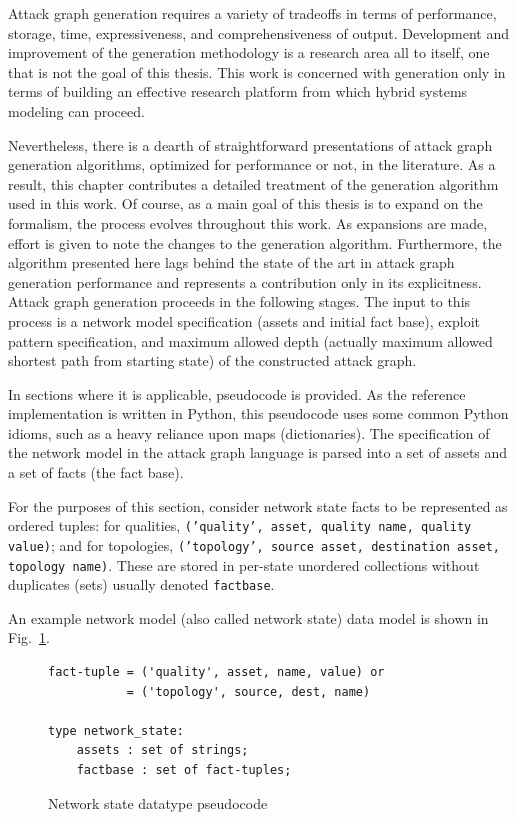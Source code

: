 Attack graph generation requires a variety of tradeoffs in terms of performance,
storage, time, expressiveness, and comprehensiveness of output. Development and
improvement of the generation methodology is a research area all to itself, one
that is not the goal of this thesis. This work is concerned with generation only
in terms of building an effective research platform from which hybrid systems
modeling can proceed.

Nevertheless, there is a dearth of straightforward presentations of attack 
graph generation algorithms, optimized for performance or not, in the 
literature. As a result, this chapter contributes a detailed treatment of the
generation algorithm used in this work. Of course, as a main goal of this
thesis is to expand on the formalism, the process evolves throughout this
work. As expansions are made, effort is given to note the changes to the
generation algorithm. Furthermore, the algorithm presented here lags behind the
state of the art in attack graph generation performance and represents a
contribution only in its explicitness.
Attack graph generation proceeds in the following stages. The input to this
process is a network model specification (assets and initial fact base),
exploit pattern specification, and maximum allowed depth (actually maximum
allowed shortest path from starting state) of the constructed attack graph.

In sections where it is applicable, pseudocode is provided. As the reference
implementation is written in Python, this pseudocode uses some common Python
idioms, such as a heavy reliance upon maps (dictionaries).
The specification of the network model in the attack graph language is
parsed into a set of assets and a set of facts (the fact base). 

For the purposes
of this section, consider network state facts to be represented as ordered
tuples: for qualities, \texttt{('quality', asset, quality name, quality value)};
and for topologies, \texttt{('topology', source asset, destination asset,
topology name)}. These are stored in per-state unordered collections without duplicates
(sets) usually denoted \texttt{factbase}.

An example network model (also called network state) data model is shown in
Fig.~\ref{fig:netstate_pc}.

\begin{figure}
\begin{lstlisting}
fact-tuple = ('quality', asset, name, value) or
           = ('topology', source, dest, name)

type network_state:
    assets : set of strings;
    factbase : set of fact-tuples;
\end{lstlisting}
\caption{Network state datatype pseudocode}
\label{fig:netstate_pc}
\end{figure}

